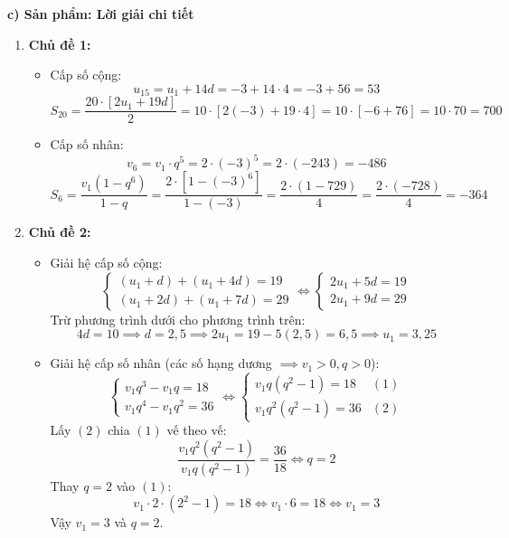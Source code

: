 \documentclass[12pt, a4paper]{article}
\begin{document}
\noindent \textbf{c) Sản phẩm: Lời giải chi tiết}
\begin{enumerate}[leftmargin=0.6cm]
    \item \textbf{Chủ đề 1:}
    \begin{itemize}
        \item Cấp số cộng:
        $$u_{15} = u_1 + 14d = -3 + 14 \cdot 4 = -3 + 56 = 53$$
        $$S_{20} = \dfrac{20 \cdot [2u_1 + 19d]}{2} = 10 \cdot [2(-3) + 19 \cdot 4] = 10 \cdot [-6 + 76] = 10 \cdot 70 = 700$$
        \item Cấp số nhân:
        $$v_6 = v_1 \cdot q^5 = 2 \cdot (-3)^5 = 2 \cdot (-243) = -486$$
        $$S_6 = \dfrac{v_1(1 - q^6)}{1 - q} = \dfrac{2 \cdot [1 - (-3)^6]}{1 - (-3)} = \dfrac{2 \cdot (1 - 729)}{4} = \dfrac{2 \cdot (-728)}{4} = -364$$
    \end{itemize}

    \item \textbf{Chủ đề 2:}
    \begin{itemize}
        \item Giải hệ cấp số cộng:
        $$\begin{cases} (u_1 + d) + (u_1 + 4d) = 19 \\ (u_1 + 2d) + (u_1 + 7d) = 29 \end{cases} \iff \begin{cases} 2u_1 + 5d = 19 \\ 2u_1 + 9d = 29 \end{cases}$$
        Trừ phương trình dưới cho phương trình trên:
        $$4d = 10 \implies d = 2{,}5 \implies 2u_1 = 19 - 5(2{,}5) = 6{,}5 \implies u_1 = 3{,}25$$
        \item Giải hệ cấp số nhân (các số hạng dương $\implies v_1 > 0, q > 0$):
        $$\begin{cases} v_1 q^3 - v_1 q = 18 \\ v_1 q^4 - v_1 q^2 = 36 \end{cases} \iff \begin{cases} v_1 q(q^2 - 1) = 18 & (1) \\ v_1 q^2(q^2 - 1) = 36 & (2) \end{cases}$$
        Lấy $(2)$ chia $(1)$ vế theo vế:
        $$\dfrac{v_1 q^2(q^2 - 1)}{v_1 q(q^2 - 1)} = \dfrac{36}{18} \iff q = 2$$
        Thay $q = 2$ vào $(1)$:
        $$v_1 \cdot 2 \cdot (2^2 - 1) = 18 \iff v_1 \cdot 6 = 18 \iff v_1 = 3$$
        Vậy $v_1 = 3$ và $q = 2$.
    \end{itemize}


\end{enumerate}
\end{document}
